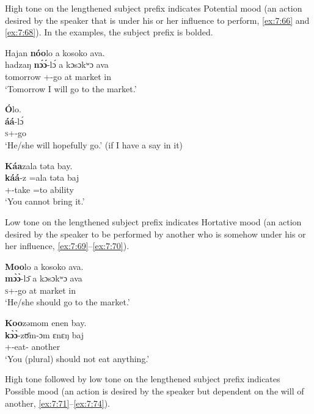 High tone on the lengthened subject prefix indicates Potential mood (an action desired by the speaker that is under his or her influence to perform, \ref{ex:7:66} and \ref{ex:7:68}). In the examples, the subject prefix is bolded.

\ea\label{ex:7:66}
Hajan  \textbf{nóo}lo a  kosoko  ava.\\
\gll  hadzaŋ  \textbf{n\'ɔ\'ɔ}{}-l\'ɔ    a  kɔsɔkʷɔ  ava\\
      tomorrow  {\oneS}+{\POT}-go  at  market  in\\
\glt  ‘Tomorrow I will go to the market.’\\
\z 

\ea\label{ex:7:67}
\textbf{Ó}lo.\\
\gll  \textbf{áá}-l\'ɔ\\
      \textsc{s}+{\POT}-go\\
\glt  ‘He/she will hopefully go.’ (if I have a say in it)\\
\z 

\ea\label{ex:7:68}
\textbf{Káa}zala  təta  bay.\\
\gll  \textbf{káá}{}-z  =ala  təta    baj\\
      {\twoS}+{\POT}-take =to  ability  {\NEG}\\
\glt  ‘You cannot bring it.’\\
\z 

Low tone on the lengthened subject prefix indicates Hortative mood (an action desired by the speaker to be performed by another who is somehow under his or her influence, \ref{ex:7:69}--\ref{ex:7:70}).

\ea\label{ex:7:69}
\textbf{Moo}lo  a  kosoko  ava.\\
\gll  \textbf{m\`ɔ\`ɔ}{}-l\=ɔ    a  kɔsɔkʷɔ  ava\\
      \textsc{s}+{\HOR}-go    at  market  in\\
\glt  ‘He/she should go to the market.’\\
\z 

\ea\label{ex:7:70}
\textbf{Koo}zəmom  enen  bay.\\
\gll  \textbf{k\`ɔ\`ɔ}{}-z\=ʊm-ɔm    ɛnɛŋ  baj\\
      {\twoP}+{\HOR}-eat-{\twoP}  another  {\NEG}\\
\glt  ‘You (plural) should not eat anything.’\\
\z 

High tone followed by low tone on the lengthened subject prefix indicates Possible mood (an action is desired by the speaker but dependent on the will of another, \ref{ex:7:71}--\ref{ex:7:74}).

